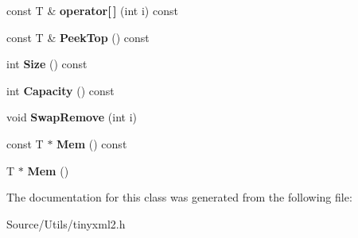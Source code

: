 \begin{DoxyCompactItemize}
const T \& {\bfseries operator\mbox{[}$\,$\mbox{]}} (int i) const
\item 
\mbox{\label{classtinyxml2_1_1_dyn_array_a5e4e1e408e646688503dec77c77c9d59}} 
const T \& {\bfseries Peek\+Top} () const
\item 
\mbox{\label{classtinyxml2_1_1_dyn_array_a67614d80847eb92cab330f1a5849a9a2}} 
int {\bfseries Size} () const
\item 
\mbox{\label{classtinyxml2_1_1_dyn_array_a8e101fdf5b4248ac119d7dca6d0f5421}} 
int {\bfseries Capacity} () const
\item 
\mbox{\label{classtinyxml2_1_1_dyn_array_aa72c644f8b5e9ec5dab5b66c88f5665f}} 
void {\bfseries Swap\+Remove} (int i)
\item 
\mbox{\label{classtinyxml2_1_1_dyn_array_a60b33e61cf10b3fd900ee46692dc0fe9}} 
const T $\ast$ {\bfseries Mem} () const
\item 
\mbox{\label{classtinyxml2_1_1_dyn_array_a2f0842cd666e2ad951f1a8bd6561fa40}} 
T $\ast$ {\bfseries Mem} ()
\end{DoxyCompactItemize}


The documentation for this class was generated from the following file\+:\begin{DoxyCompactItemize}
\item 
Source/\+Utils/tinyxml2.\+h\end{DoxyCompactItemize}
